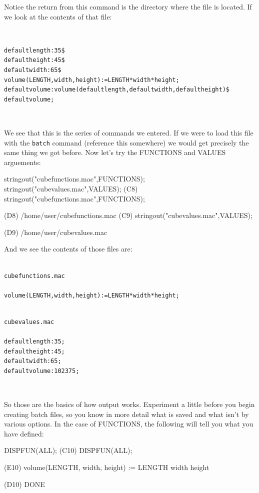 Notice the return from this command is the directory where the file is located.  If we look at the contents of that file:

~

\begin{verbatim}
defaultlength:35$
defaultheight:45$
defaultwidth:65$
volume(LENGTH,width,height):=LENGTH*width*height;
defaultvolume:volume(defaultlength,defaultwidth,defaultheight)$
defaultvolume;
\end{verbatim}

~

We see that this is the series of commands we entered.  If we were to load
this file with the \texttt{batch} command (reference this somewhere) we would get precisely the same thing we got before.  Now let's try the FUNCTIONS and VALUES arguements:

\beginmaximasession
stringout("cubefunctions.mac",FUNCTIONS);
stringout("cubevalues.mac",VALUES);
\maximasession
(C8) stringout("cubefunctions.mac",FUNCTIONS);

(D8)   /home/user/cubefunctions.mac
(C9) stringout("cubevalues.mac",VALUES);

(D9)    /home/user/cubevalues.mac
\endmaximasession

And we see the contents of those files are:

\begin{verbatim}

cubefunctions.mac

volume(LENGTH,width,height):=LENGTH*width*height;
\end{verbatim}


\begin{verbatim}

cubevalues.mac

defaultlength:35;
defaultheight:45;
defaultwidth:65;
defaultvolume:102375;
\end{verbatim}

~

So those are the basics of how output works.  Experiment a little before you
begin creating batch files, so you know in more detail what is saved and
what isn't by various options.  In the case of FUNCTIONS, the following
will tell you what you have defined:

\beginmaximasession
DISPFUN(ALL);
\maximasession
(C10) DISPFUN(ALL);

(E10)        volume(LENGTH, width, height) := LENGTH width height

(D10)                                DONE
\endmaximasession

